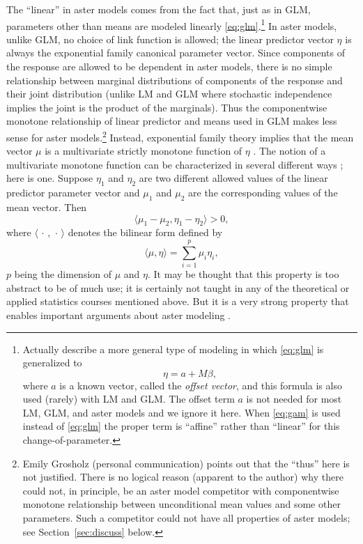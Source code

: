 \documentclass[11pt]{article}
\newcommand{\inner}[1]{\langle #1 \rangle}
\newcommand{\fatdot}{\,\cdot\,}
\begin{document}
The ``linear'' in aster models comes from the fact that, just as in GLM,
parameters other than means are modeled linearly
\eqref{eq:glm}.\footnote{Actually \citet{aster1} describe a more general type
of modeling in which \eqref{eq:glm} is generalized to \label{foot:affine}
\begin{equation} \label{eq:gam}
   \eta = a + M \beta,
\end{equation}
where $a$ is a known vector, called the \emph{offset vector},
and this formula is
also used (rarely) with LM and GLM.  The offset term $a$ is not needed for most
LM, GLM, and aster models and we ignore it here.  When \eqref{eq:gam} is used
instead of \eqref{eq:glm} the proper term is ``affine'' rather than ``linear''
for this change-of-parameter.}
In aster
models, unlike GLM, no choice of link function is allowed;
the linear predictor vector $\eta$ is always the exponential
family canonical parameter vector.  Since components of the
response are allowed to be dependent in aster models, there is no simple
relationship between marginal distributions of components of the response
and their joint distribution (unlike LM and GLM where stochastic independence
implies the joint is the product of the marginals).  Thus the componentwise
monotone relationship of linear predictor and means used in GLM makes less sense
for aster models.\footnote{Emily Grosholz (personal communication) points out
that the ``thus'' here is not justified.  There is no logical reason
(apparent to the author) why there
could not, in principle, be an aster model competitor with componentwise
monotone relationship between unconditional mean values and some other
parameters.  Such a competitor could not have all properties of aster models;
see Section~\ref{sec:discuss} below.}
Instead, exponential family theory implies that the mean
vector $\mu$ is a multivariate strictly monotone function of $\eta$
\citep[p.~121]{barndorff-nielsen}.
The notion of a multivariate monotone function can be characterized in several
different ways \citep[Chapter~12]{rockafellar-wets}; here is one.
Suppose $\eta_1$ and $\eta_2$ are two different allowed values of the linear
predictor parameter vector and $\mu_1$ and $\mu_2$ are the corresponding
values of the mean vector.  Then
$$
   \inner{\mu_1 - \mu_2, \eta_1 - \eta_2} > 0,
$$
where $\inner{\fatdot, \fatdot}$ denotes the bilinear form defined by
\begin{equation} \label{eq:bilinear}
   \inner{\mu, \eta} = \sum_{i = 1}^p \mu_i \eta_i,
\end{equation}
$p$ being the dimension of $\mu$ and $\eta$.
It may be thought that this property is too abstract to be of much use;
it is certainly not taught in any of the theoretical or applied statistics
courses mentioned above.  But it is a very strong property that enables
important arguments about aster modeling
\citep[appendix on monotonicity; see also Section~\ref{sec:moron}
below]{aster3}.
\end{document}
